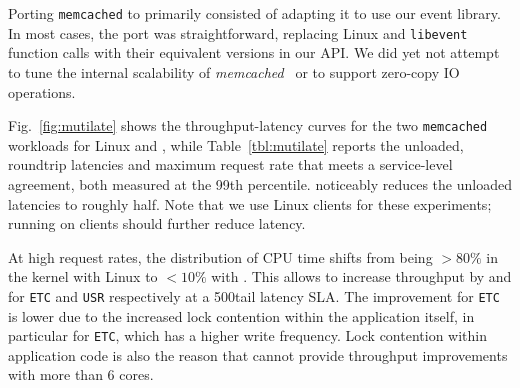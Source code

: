 Porting \texttt{memcached} to \ix primarily consisted of adapting it
to use our event library. In most cases, the port was straightforward,
replacing Linux and \texttt{libevent} function calls with their
equivalent versions in our API.   We did yet not attempt to tune the
internal scalability of {\it memcached}~\cite{DBLP:conf/nsdi/FanAK13}
or to support zero-copy IO operations.




Fig.~\ref{fig:mutilate} shows the throughput-latency curves for the
two \texttt{memcached} workloads for Linux and \ix, while
Table~\ref{tbl:mutilate} reports the unloaded, roundtrip latencies and
maximum request rate that meets a service-level agreement, both
measured at the 99th percentile.  \ix noticeably reduces the unloaded
latencies to roughly half.  Note that we use Linux clients for these
experiments; running \ix on clients should further reduce latency.

At high request rates, the distribution of CPU time shifts from being
$>80\%$ in the kernel with Linux to $<10\%$ with \ix. This allows \ix
to increase throughput by  and  for
\texttt{ETC} and \texttt{USR} respectively at a 500\microsecond tail
latency SLA.  The improvement for \texttt{ETC} is lower due to the
increased lock contention within the application itself, in particular
for \texttt{ETC}, which has a higher write frequency.  Lock contention
within application code is also the reason that \ix cannot provide
throughput improvements with more than 6 cores.


%

